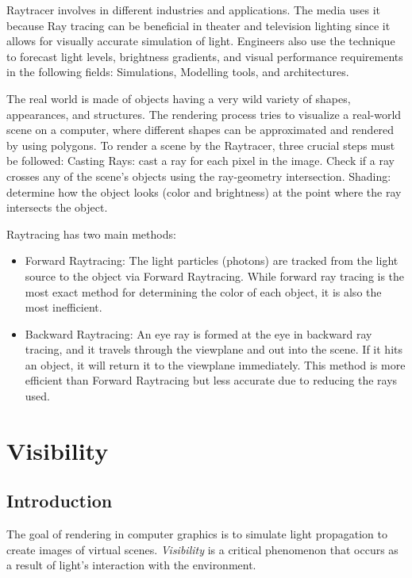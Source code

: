 \documentclass{article}
\begin{document}
	\vspace*{5px}
	Raytracer involves in different industries and applications. The media uses it because Ray tracing can be beneficial in theater and television lighting since it allows for visually accurate simulation of light. Engineers also use the technique to forecast light levels, brightness gradients, and visual performance requirements in the following fields: Simulations, Modelling tools, and architectures. 
	
	The real world is made of objects having a very wild variety of shapes, appearances, and structures. The rendering process tries to visualize a real-world scene on a computer, where different shapes can be approximated and rendered by using polygons. To render a scene by the Raytracer, three crucial steps must be followed: 
	Casting Rays: cast a ray for each pixel in the image.
	Check if a ray crosses any of the scene's objects using the ray-geometry intersection.
	Shading: determine how the object looks (color and brightness) at the point where the ray intersects the object.
	
	\vspace*{5px}
	Raytracing has two main methods: 
	\begin{itemize}
		\item 	Forward Raytracing: The light particles (photons) are tracked from the light source to the object via Forward Raytracing. While forward ray tracing is the most exact method for determining the color of each object, it is also the most inefficient.
		\item 	Backward Raytracing: 
		An eye ray is formed at the eye in backward ray tracing, and it travels through the viewplane and out into the scene. If it hits an object, it will return it to the viewplane immediately. This method is more efficient than Forward Raytracing but less accurate due to reducing the rays used.
	\end{itemize}
	
	\section{Visibility}
	\subsection{Introduction}
	The goal of rendering in computer graphics is to simulate light propagation to create images of virtual scenes. \textit{Visibility} is a critical phenomenon that occurs as a result of light's interaction with the environment.
	
\end{document}
